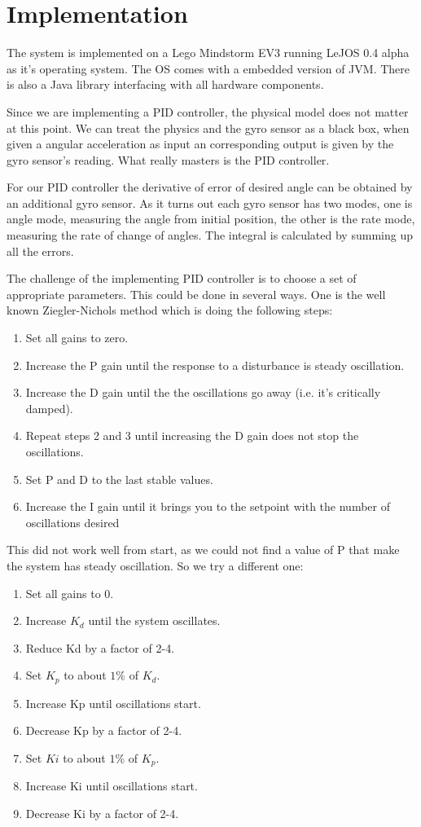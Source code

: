 \documentclass{notes}
\begin{document}
\section{Implementation}

The system is implemented on a Lego Mindstorm EV3 running LeJOS 0.4 alpha as it's operating system. 
The OS comes with a embedded version of JVM. There is also a Java library interfacing with all
hardware components.

Since we are implementing a PID controller, the physical model does not matter at this point. 
We can treat the physics and the gyro sensor as a black box, when given a angular acceleration as
input an corresponding output is given by the gyro sensor's reading. What really masters is the PID
controller.

For our PID controller the derivative of error of desired angle can be obtained by an additional
gyro sensor. As it turns out each gyro sensor has two modes, one is angle mode, measuring the angle
from initial position, the other is the rate mode, measuring the rate of change of angles. The
integral is calculated by summing up all the errors. 

The challenge of the implementing PID controller is to choose a set of appropriate parameters. This
could be done in several ways. One is the well known Ziegler-Nichols method which is doing the
following steps: 
\begin{enumerate}
  \item Set all gains to zero.
  \item Increase the P gain until the response to a disturbance is steady oscillation. 
  \item Increase the D gain until the the oscillations go away (i.e. it's critically damped).
  \item Repeat steps 2 and 3 until increasing the D gain does not stop the oscillations.
  \item Set P and D to the last stable values.
  \item Increase the I gain until it brings you to the setpoint with the number of oscillations desired 
\end{enumerate}

This did not work well from start, as we could not find a value of P that make the system has steady
oscillation. So we try a different one:

\begin{enumerate}
\item Set all gains to 0.
\item Increase $K_d$ until the system oscillates.
\item Reduce Kd by a factor of 2-4.
\item Set $K_p$ to about $1\%$ of $K_d$.
\item Increase Kp until oscillations start.
\item Decrease Kp by a factor of 2-4.
\item Set $Ki$ to about $1\%$ of $K_p$.
\item Increase Ki until oscillations start.
\item Decrease Ki by a factor of 2-4.
\end{enumerate}
\end{document}
